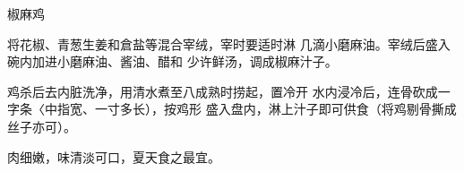 \begin{recipe}{椒麻鸡}

\ingredients




\cooking

将花椒、青葱生姜和倉盐等混合宰绒，宰时要适时淋 几滴小磨麻油。宰绒后盛入碗内加进小磨麻油、酱油、醋和 少许鲜汤，调成椒麻汁子。

鸡杀后去内脏洗净，用清水煮至八成熟时捞起，置冷开 水内浸冷后，连骨砍成一字条〈中指宽、一寸多长），按鸡形 盛入盘内，淋上汁子即可供食（将鸡剔骨撕成丝子亦可）。

\notes

肉细嫩，味清淡可口，夏天食之最宜。

\end{recipe}

